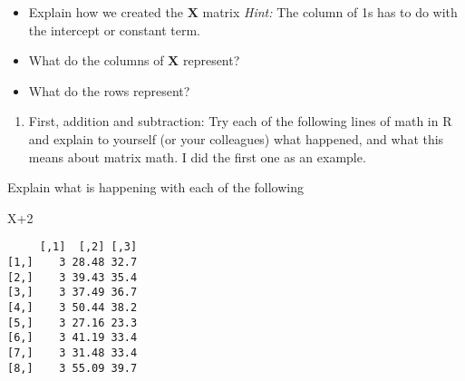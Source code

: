 \documentclass[10pt,]{article}
\newenvironment{Shaded}{\begin{snugshade}}{\end{snugshade}}
\newcommand{\KeywordTok}[1]{\textcolor[rgb]{0.13,0.29,0.53}{\textbf{{#1}}}}
\newcommand{\DataTypeTok}[1]{\textcolor[rgb]{0.13,0.29,0.53}{{#1}}}
\newcommand{\DecValTok}[1]{\textcolor[rgb]{0.00,0.00,0.81}{{#1}}}
\newcommand{\CommentTok}[1]{\textcolor[rgb]{0.56,0.35,0.01}{\textit{{#1}}}}
\newcommand{\NormalTok}[1]{{#1}}
\providecommand{\tightlist}{%
  \setlength{\itemsep}{0pt}\setlength{\parskip}{0pt}}
\begin{document}
\begin{Shaded}
\end{Shaded}

\begin{itemize}
\tightlist
\item
  Explain how we created the \(\bm{X}\) matrix \emph{Hint:} The column
  of 1s has to do with the intercept or constant term.
\item
  What do the columns of \(\bm{X}\) represent?
\item
  What do the rows represent?
\end{itemize}

\begin{enumerate}
\def\labelenumi{\arabic{enumi}.}
\setcounter{enumi}{1}
\tightlist
\item
  First, addition and subtraction: Try each of the following lines of
  math in R and explain to yourself (or your colleagues) what happened,
  and what this means about matrix math. I did the first one as an
  example.
\end{enumerate}

Explain what is happening with each of the following

\begin{Shaded}
\begin{Highlighting}[]
\NormalTok{X}\DecValTok{+2}
\end{Highlighting}
\end{Shaded}

\begin{verbatim}
     [,1]  [,2] [,3]
[1,]    3 28.48 32.7
[2,]    3 39.43 35.4
[3,]    3 37.49 36.7
[4,]    3 50.44 38.2
[5,]    3 27.16 23.3
[6,]    3 41.19 33.4
[7,]    3 31.48 33.4
[8,]    3 55.09 39.7
\end{verbatim}
\end{document}

